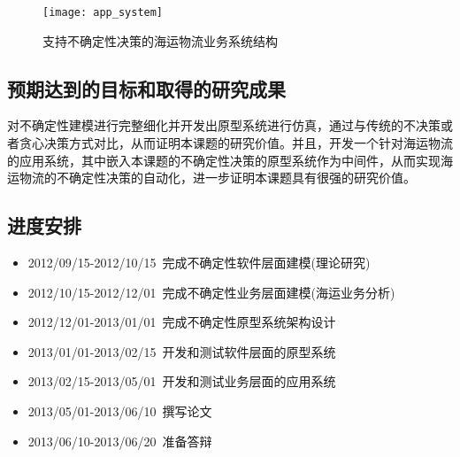 \begin{figure}[htbp]
    \centering
    \texttt{[image: app\_system]}
    \caption{支持不确定性决策的海运物流业务系统结构}\label{figure:app_system}
    \vspace{-1em}
\end{figure}

\subsection{预期达到的目标和取得的研究成果}

对不确定性建模进行完整细化并开发出原型系统进行仿真，通过与传统的不决策或者贪心决策方式对比，从而证明本课题的研究价值。并且，开发一个针对海运物流的应用系统，其中嵌入本课题的不确定性决策的原型系统作为中间件，从而实现海运物流的不确定性决策的自动化，进一步证明本课题具有很强的研究价值。

\subsection{进度安排}
\begin{itemize}
    \item 2012/09/15-2012/10/15~完成不确定性软件层面建模(理论研究)
    \item 2012/10/15-2012/12/01~完成不确定性业务层面建模(海运业务分析)
    \item 2012/12/01-2013/01/01~完成不确定性原型系统架构设计
    \item 2013/01/01-2013/02/15~开发和测试软件层面的原型系统
    \item 2013/02/15-2013/05/01~开发和测试业务层面的应用系统
    \item 2013/05/01-2013/06/10~撰写论文
    \item 2013/06/10-2013/06/20~准备答辩
\end{itemize}


